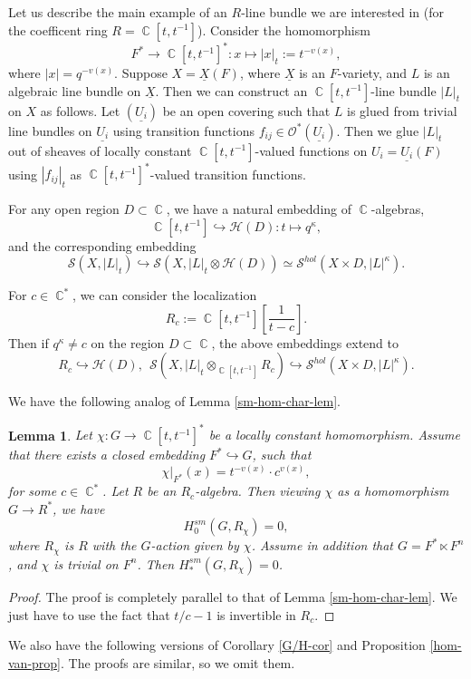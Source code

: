 \documentclass[12pt,reqno]{amsart}
\DeclareMathOperator\C{\mathbb C}
\newtheorem{lemma}[theorem]{Lemma}
\theoremstyle{definition}
\theoremstyle{remark}
\numberwithin{equation}{section}
\newcommand{\und}{\underline}
\newcommand{\hra}{\hookrightarrow}
\newcommand{\ot}{\otimes}
\renewcommand{\SS}{{\mathcal S}}
\newcommand{\HH}{{\mathcal H}}
\newcommand{\OO}{{\mathcal O}}
\newcommand{\sub}{\subset}
\begin{document}
Let us describe the main example of an $R$-line bundle we are interested in (for the coefficent ring $R=\C[t,t^{-1}]$). 
Consider the homomorphism
$$F^*\to \C[t,t^{-1}]^*: x\mapsto |x|_t:=t^{-v(x)},$$
where $|x|=q^{-v(x)}$. Suppose
$X=\und{X}(F)$, where $\und{X}$ is an $F$-variety, and $L$ is an algebraic line bundle on $\und{X}$. 
Then we can construct an $\C[t,t^{-1}]$-line bundle $|L|_t$ on $X$ as follows.
Let $(\und{U_i})$ be an open covering such that $L$ is glued from trivial line bundles on $\und{U_i}$ using transition functions
$f_{ij}\in \OO^*(\und{U_i})$. Then we glue $|L|_t$ out of sheaves of locally constant $\C[t,t^{-1}]$-valued functions on $U_i=\und{U_i}(F)$
using $|f_{ij}|_t$ as $\C[t,t^{-1}]^*$-valued transition functions.

For any open region $D\sub \C$, we have a natural embedding of $\C$-algebras, 
$$\C[t,t^{-1}]\hra\HH(D): t\mapsto q^{\kappa},$$
and the corresponding embedding 
$$\SS(X,|L|_t)\hra \SS(X,|L|_t\ot\HH(D))\simeq \SS^{hol}(X\times D,|L|^{\kappa}).$$

For $c\in \C^*$, we can consider the localization 
$$R_c:=\C[t,t^{-1}][\frac{1}{t-c}].$$
Then if $q^{\kappa}\neq c$ on the region $D\sub \C$, the above embeddings extend to
$$R_c\hra \HH(D), \ \ \SS(X,|L|_t\ot_{\C[t,t^{-1}]}R_c)\hra \SS^{hol}(X\times D,|L|^{\kappa}).$$

We have the following analog of Lemma \ref{sm-hom-char-lem}.

\begin{lemma}\label{sm-hom-char-R-lem}
Let $\chi:G\to \C[t,t^{-1}]^*$ be a locally constant homomorphism. Assume that there exists a closed embedding $F^*\hra G$, such that
$$\chi|_{F^*}(x)=t^{-v(x)}\cdot c^{v(x)},$$
for some $c\in \C^*$. Let $R$ be an $R_c$-algebra. Then viewing 
$\chi$ as a homomorphism $G\to R^*$, we have
$$H^{sm}_0(G,R_\chi)=0,$$
where $R_\chi$ is $R$ with the $G$-action given by $\chi$.
Assume in addition that
$G=F^*\ltimes F^n$, and $\chi$ is trivial on $F^n$.
Then $H^{sm}_*(G,R_\chi)=0$.
\end{lemma}

\begin{proof}
The proof is completely parallel to that of Lemma \ref{sm-hom-char-lem}.
We just have to use the fact that $t/c-1$ is invertible in $R_c$.
\end{proof}

We also have the following versions of Corollary \ref{G/H-cor} and Proposition \ref{hom-van-prop}.
The proofs are similar, so we omit them.
\end{document}
